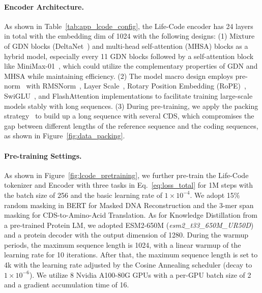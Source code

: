 \paragraph{Encoder Architecture.}
As shown in Table~\ref{tab:app_lcode_config}, the Life-Code encoder has 24 layers in total with the embedding dim of 1024 with the following designs: (1) Mixture of GDN blocks (DeltaNet~\citep{yang2025deltanet}) and multi-head self-attention (MHSA) blocks as a hybrid model, especially every 11 GDN blocks followed by a self-attention block like MiniMax-01~\citep{MiniMax2025MiniMax01}, which could utilize the complementary properties of GDN and MHSA while maintaining efficiency. (2) The model macro design employs pre-norm~\citep{acl2019PreNorm} with RMSNorm~\citep{Zhang2019RMSNorm}, Layer Scale~\citep{iccv2021CaiT}, Rotary Position Embedding (RoPE)~\citep{Su2021RoFormer}, SwiGLU~\citep{Touvron2023LLaMA}, and FlashAttention implementations to facilitate training large-scale models stably with long sequences. (3) During pre-training, we apply the packing strategy~\citep{Warner2024ModernBERT} to build up a long sequence with several CDS, which compromises the gap between different lengths of the reference sequence and the coding sequences, as shown in Figure~\ref{fig:data_packing}.

\vspace{-0.5em}
\paragraph{Pre-training Settings.}
As shown in Figure~\ref{fig:lcode_pretraining}, we further pre-train the Life-Code tokenizer and Encoder with three tasks in Eq.~\ref{eq:loss_total} for 1M steps with the batch size of 256 and the basic learning rate of $1\times 10^{-4}$. We adopt 15\% random masking in BERT for Masked DNA Reconstruction and the 3-mer span masking for CDS-to-Amino-Acid Translation. As for Knowledge Distillation from a pre-trained Protein LM, we adopted ESM2-650M (\textit{esm2\_t33\_650M\_UR50D})~\citep{lin2022ESM2} and a protein decoder with the output dimension of 1280. During the warmup periods, the maximum sequence length is 1024, with a linear warmup of the learning rate for 10 iterations. After that, the maximum sequence length is set to 4k with the learning rate adjusted by the Cosine Annealing scheduler (decay to $1\times 10^{-6}$). We utilize 8 Nvidia A100-80G GPUs with a per-GPU batch size of 2 and a gradient accumulation time of 16.



